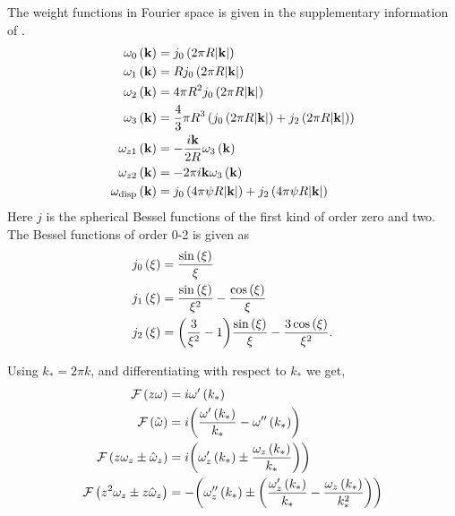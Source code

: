 \documentclass[english]{dftmemo}
\newcommand*{\lb}{\ensuremath{\left(}}
\newcommand*{\rb}{\ensuremath{\right)}}
\newcommand{\disp}{\ensuremath{\text{disp}}\xspace}
\begin{document}
The weight functions in Fourier space is given in the supplementary information of \citet{stierle2020a}.
\begin{align}
  \label{eq:weight_functions_fourier}
  \omega_0 \lb \mathbf{k}\rb &= j_0\lb 2 \pi R |\mathbf{k}| \rb  \\
  \omega_1 \lb \mathbf{k}\rb &= R j_0\lb 2 \pi R |\mathbf{k}| \rb  \\
  \omega_2 \lb \mathbf{k}\rb &= 4 \pi R^2 j_0\lb 2 \pi R |\mathbf{k}| \rb  \\
  \omega_3 \lb \mathbf{k}\rb &= \frac{4}{3} \pi R^3 \lb j_0\lb 2 \pi R |\mathbf{k}| \rb + j_2\lb 2 \pi R |\mathbf{k}| \rb \rb  \\
  \omega_{z1} \lb \mathbf{k}\rb &= - \frac{i \mathbf{k}}{2 R} \omega_3 \lb \mathbf{k}\rb  \\
  \omega_{z2} \lb \mathbf{k}\rb &= - 2 \pi i \mathbf{k} \omega_3 \lb \mathbf{k}\rb  \\
  \omega_{\disp} \lb \mathbf{k}\rb &= j_0\lb 4 \pi \psi R |\mathbf{k}| \rb + j_2\lb 4 \pi \psi R |\mathbf{k}| \rb
\end{align}
Here $j$ is the spherical Bessel functions of the first kind of order
zero and two. The Bessel functions of order 0-2 is given as
\begin{align}
  \label{eq:bessel_functions}
  j_0\lb \xi \rb &= \frac{\sin \lb \xi \rb}{\xi} \\
  j_1\lb \xi \rb &= \frac{\sin \lb \xi \rb}{\xi^2} - \frac{\cos \lb \xi \rb}{\xi}  \\
  j_2\lb \xi \rb &= \biggl(\frac{3}{\xi^2} - 1\biggr) \frac{\sin \lb \xi \rb}{\xi} - \frac{3 \cos \lb \xi \rb}{\xi^2}.
\end{align}

Using $k_* = 2 \pi k$, and differentiating with respect to $k_*$ we get,
\begin{align}
  \mathcal{F}\lb z \omega \rb &= i \omega^\prime \lb k_* \rb \\
  \mathcal{F}\lb \tilde{\omega} \rb &= i\biggl( \frac{\omega^\prime \lb k_* \rb}{k_*} - \omega^{\prime\prime} \lb k_* \rb \biggr) \\
  \mathcal{F}\lb z \omega_z \pm \hat{\omega}_z \rb &= i \biggl( \omega_z^\prime \lb k_* \rb \pm \frac{\omega_z \lb k_* \rb}{k_*} \biggr)\biggr) \\
  \mathcal{F}\lb z^2 \omega_z \pm z\hat{\omega}_z \rb &= -\biggl( \omega_z^{\prime\prime} \lb k_* \rb \pm \biggl( \frac{\omega_z^\prime \lb k_* \rb}{k_*} - \frac{\omega_z \lb k_* \rb}{k_*^{2}}\biggr)\biggr)
\end{align}
\end{document}
